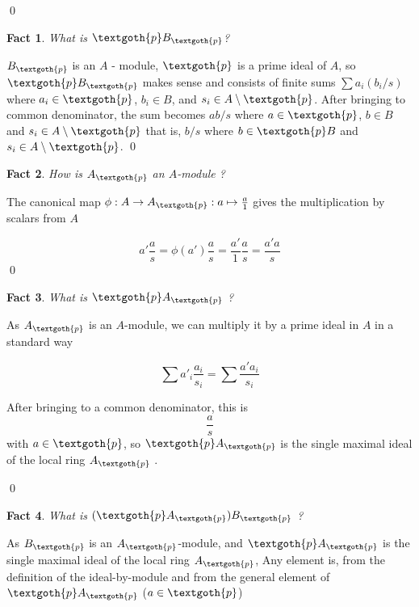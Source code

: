 \documentclass{article}
\newtheorem{theorem}{Fact}[section]
\begin{document}
\qed

\bigskip
\begin{theorem}
What is $ \textgoth{p} B_\textgoth{p}$?
\end{theorem}

$B_\textgoth{p}$ is an $A$ - module, $\textgoth{p}$ is a prime ideal of $A$, so $ \textgoth{p} B_\textgoth{p}$ makes sense and consists of finite sums $\sum a_i (b_i / s)$ where $a_i \in \textgoth{p}$, $b_i \in B$, and $s_i \in A \setminus \textgoth{p}$.
After bringing to common denominator, the sum becomes $ab/s$ where $a \in \textgoth{p}$, $b \in B$ and $s_i \in A \setminus \textgoth{p}$ that is, $b/s$ where $b \in \textgoth{p} B$ and $s_i \in A \setminus \textgoth{p}$.
\qed

\bigskip
\begin{theorem}
How is $A_\textgoth{p}$ an $A$-module ?
\end{theorem}

The canonical map $\phi: A \rightarrow A_\textgoth{p}: a \mapsto \frac{a}{1}$ gives the multiplication by scalars from $A$

\[
 a' \frac{a}{s} = \phi(a') \frac{a}{s} = \frac{a'}{1} \frac{a}{s} = \frac{a' a}{s}
\]
\qed

\bigskip
\begin{theorem}
What is $ \textgoth{p} A_\textgoth{p}$ ?
\end{theorem}

As $A_\textgoth{p}$ is an $A$-module, we can multiply it by a prime ideal in $A$ in a standard way

\[
 \sum a'_i \frac{a_i}{s_i} = \sum \frac{a' a_i}{s_i}
\]

\noindent
After bringing to a common denominator, this is
\[
 \frac{a}{s}
\]
\noindent
with $a \in \textgoth{p}$, so $ \textgoth{p} A_\textgoth{p}$ is the single maximal ideal of the local ring $A_\textgoth{p}$ .

\qed

\bigskip
\begin{theorem}
What is $(\textgoth{p} A_\textgoth{p}) B_\textgoth{p}$ ?
\end{theorem}

As $B_\textgoth{p}$ is an $A_\textgoth{p}$-module, and $\textgoth{p} A_\textgoth{p}$ is the single maximal ideal of the local ring $A_\textgoth{p}$, Any element is, from the definition of the ideal-by-module and from the general element of $\textgoth{p} A_\textgoth{p}$ ($a \in \textgoth{p}$)
\end{document}
